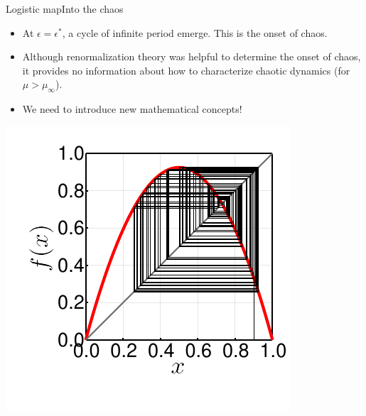 \documentclass[usenames,dvipsnames,svgnames,10pt,aspectratio=169]{beamer}
\begin{document}
\begin{frame}[t, c]{Logistic map}{Into the chaos}
	\begin{minipage}{.68\textwidth}
		\begin{itemize}
			\item At \( \epsilon = \epsilon^* \), a cycle of infinite period emerge. This is the onset of chaos.

			\bigskip

			\item Although renormalization theory was helpful to determine the onset of chaos, it provides no information about how to characterize chaotic dynamics (for \( \mu > \mu_{\infty} \)).

			\bigskip

			\item We need to introduce new mathematical concepts!

		\end{itemize}
	\end{minipage}%
	\hfill
	\begin{minipage}{.28\textwidth}
		\includegraphics[width=\textwidth]{into_the_chaos}
	\end{minipage}

	\vspace{1cm}
\end{frame}
\end{document}
